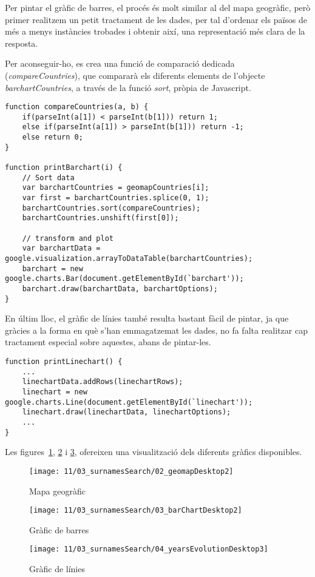 Per pintar el gràfic de barres, el procés és molt similar al del mapa geogràfic, però primer realitzem un petit tractament de les dades, per tal d'ordenar els països de més a menys instàncies trobades i obtenir així, una representació més clara de la resposta.

Per aconseguir-ho, es crea una funció de comparació dedicada (\emph{compare\-Countries}), que compararà els diferents elements de l'objecte \emph{barchartCountries}, a través de la funció \emph{sort}, pròpia de Javascript.

\begin{lstlisting}[style=rawOwn,caption={Creació del gràfic de barres}]
function compareCountries(a, b) {
    if(parseInt(a[1]) < parseInt(b[1])) return 1;
    else if(parseInt(a[1]) > parseInt(b[1])) return -1;
    else return 0;
}

function printBarchart(i) {
    // Sort data
    var barchartCountries = geomapCountries[i];
    var first = barchartCountries.splice(0, 1);
    barchartCountries.sort(compareCountries);
    barchartCountries.unshift(first[0]);

    // transform and plot
    var barchartData = google.visualization.arrayToDataTable(barchartCountries);
    barchart = new google.charts.Bar(document.getElementById(`barchart'));
    barchart.draw(barchartData, barchartOptions);
}
\end{lstlisting}

En últim lloc, el gràfic de línies també resulta bastant fàcil de pintar, ja que gràcies a la forma en què s’han emmagatzemat les dades, no fa falta realitzar cap tractament especial sobre aquestes, abans de pintar-les.

\begin{lstlisting}[style=rawOwn,caption={Creació del gràfic de línies}]
function printLinechart() {
    ...
    linechartData.addRows(linechartRows);
    linechart = new google.charts.Line(document.getElementById(`linechart'));
    linechart.draw(linechartData, linechartOptions);
    ...
}
\end{lstlisting}

Les figures~\ref{fig:geomap}, \ref{fig:barchart} i \ref{fig:linechart}, ofereixen una visualització dels diferents gràfics disponibles.

\begin{figure}[h]
    \texttt{[image: 11/03\_surnamesSearch/02\_geomapDesktop2]}
    \centering
    \caption{Mapa geogràfic}\label{fig:geomap}
\end{figure}

\begin{figure}[h]
    \texttt{[image: 11/03\_surnamesSearch/03\_barChartDesktop2]}
    \centering
    \caption{Gràfic de barres}\label{fig:barchart}
\end{figure}

\begin{figure}[h]
    \texttt{[image: 11/03\_surnamesSearch/04\_yearsEvolutionDesktop3]}
    \centering
    \caption{Gràfic de línies}\label{fig:linechart}
\end{figure}
